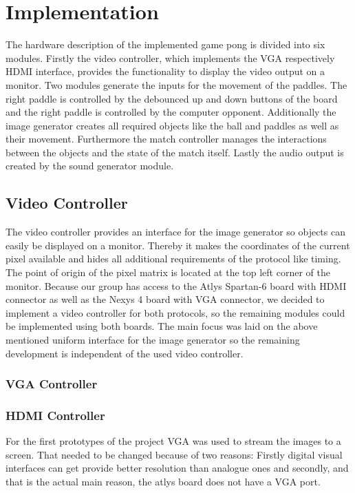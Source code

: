 \newpage
\section{Implementation} 
The hardware description of the implemented game pong is divided into six modules. Firstly the video controller, which implements the VGA respectively HDMI interface, provides the functionality to display the video output on a monitor. Two modules generate the inputs for the movement of the paddles. The right paddle is controlled by the debounced up and down buttons of the board and the right paddle is controlled by the computer opponent. Additionally the image generator creates all required objects like the ball and paddles as well as their movement. Furthermore the match controller manages the interactions between the objects and the state of the match itself. Lastly the audio output is created by the sound generator module.
	\subsection{Video Controller}
    The video controller provides an interface for the image generator so objects can easily be displayed on a monitor. Thereby it makes the coordinates of the current pixel available and hides all additional requirements of the protocol like timing. The point of origin of the pixel matrix is located at the top left corner of the monitor. Because our group has access to the Atlys Spartan-6 board with HDMI connector as well as the Nexys 4 board with VGA connector, we decided to implement a video controller for both protocols, so the remaining modules could be implemented using both boards. The main focus was laid on the above mentioned uniform interface for the image generator so the remaining development is independent of the used video controller.
        \subsubsection{VGA Controller}
        \subsubsection{HDMI Controller}
For the first prototypes of the project VGA was used to stream the images to a screen. That needed to be changed because of two reasons: Firstly digital visual interfaces can get provide better resolution than analogue ones and secondly, and that is the actual main reason, the atlys board does not have a VGA port.

